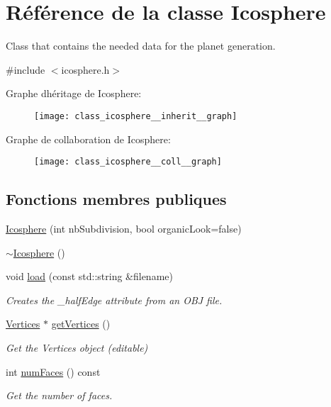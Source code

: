 \hypertarget{class_icosphere}{}\section{Référence de la classe Icosphere}
\label{class_icosphere}


Class that contains the needed data for the planet generation.  




{\ttfamily \#include $<$icosphere.\+h$>$}



Graphe d\textquotesingle{}héritage de Icosphere\+:
\nopagebreak
\begin{figure}[H]
\begin{center}
\leavevmode
\texttt{[image: class\_icosphere\_\_inherit\_\_graph]}
\end{center}
\end{figure}


Graphe de collaboration de Icosphere\+:
\nopagebreak
\begin{figure}[H]
\begin{center}
\leavevmode
\texttt{[image: class\_icosphere\_\_coll\_\_graph]}
\end{center}
\end{figure}
\subsection*{Fonctions membres publiques}
\begin{DoxyCompactItemize}
\item 
\hyperlink{class_icosphere_acbbb6a69f296101cbf883e8b17d0e24f}{Icosphere} (int nb\+Subdivision, bool organic\+Look=false)
\item 
\hyperlink{class_icosphere_ac9473c8c8d6085b6370d95772b898a45}{$\sim$\+Icosphere} ()
\item 
void \hyperlink{class_icosphere_a1b20bf118a66f5202228a5a4522bd7fd}{load} (const std\+::string \&filename)
\begin{DoxyCompactList}\small\item\em Creates the \+\_\+half\+Edge attribute from an O\+BJ file. \end{DoxyCompactList}\item 
\hyperlink{struct_shape_1_1_vertices}{Vertices} $\ast$ \hyperlink{class_icosphere_aae0a9d0e0cff48ca120bd401e2cb14f4}{get\+Vertices} ()
\begin{DoxyCompactList}\small\item\em Get the Vertices object (editable) \end{DoxyCompactList}\item 
int \hyperlink{class_icosphere_a4bacbf52b66b1c6b3e80380a0bb4c9e5}{num\+Faces} () const
\begin{DoxyCompactList}\small\item\em Get the number of faces. \end{DoxyCompactList}\end{DoxyCompactItemize}
